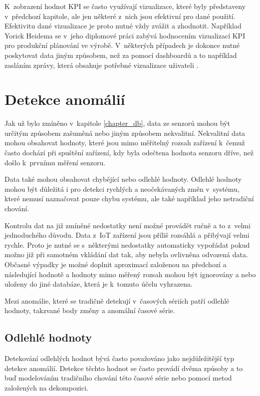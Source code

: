 K~zobrazení hodnot KPI se často využívají vizualizace, které byly představeny v~předchozí kapitole, ale jen některé z~nich jsou efektivní pro dané použití. Efektivitu dané vizualizace je proto nutné vždy zvážit a zhodnotit. Například Yorick Heidema se v~jeho diplomové práci \cite{heidema2018visualizing} zabývá hodnocením vizualizací KPI pro produkční plánování ve výrobě. V~některých případech je dokonce nutné poskytovat data jiným způsobem, než za pomocí dashboardů a to například zasláním zprávy, která obsahuje potřebné vizualizace uživateli \cite{hemment2016community}.
\section{Detekce anomálií}
Jak už bylo zmíněno v~kapitole \ref{chapter_db}, data ze senzorů mohou být určitým způsobem zašuměná nebo jiným způsobem nekvalitní. Nekvalitní data mohou obsahovat hodnoty, které jsou mimo měřitelný rozsah zařízení k~čemuž často dochází při spuštění zařízení, kdy byla odečtena hodnota senzoru dříve, než došlo k~prvnímu měření senzoru. 

Data také mohou obsahovat chybějící nebo odlehlé hodnoty. Odlehlé hodnoty mohou být důležitá i pro detekci rychlých a neočekávaných změn v~systému, které nemusí naznačovat pouze chybu systému, ale také například jeho netradiční chování.

Kontrolu dat na již zmíněné nedostatky není možné provádět ručně a to z~velmi jednoduchého důvodu. Data z~IoT zařízení jsou příliš rozsáhlá a přibývají velmi rychle. Proto je nutné se s~některými nedostatky automaticky vypořádat pokud možno již při samotném vkládání dat tak, aby nebyla ovlivněna odvozená data. Občasné výpadky je možné doplnit aproximací založenou na předchozí a následující hodnotě a hodnoty mimo měřený rozsah mohou být ignorovány a nebo uloženy do jiné databáze, která je k~tomuto účelu vyhrazena.

Mezi anomálie, které se tradičně detekují v~časových sériích \cite{laptev2015generic, ren2019time} patří odlehlé hodnoty, takzvané body změny a anomální časové série.
\subsection*{Odlehlé hodnoty}
Detekování odlehlých hodnot bývá často považováno jako nejdůležitější typ detekce anomálií. Detekce těchto hodnot se často provádí dvěma způsoby a to buď modelováním tradičního chování této časové série nebo pomocí metod založených na dekompozici.

